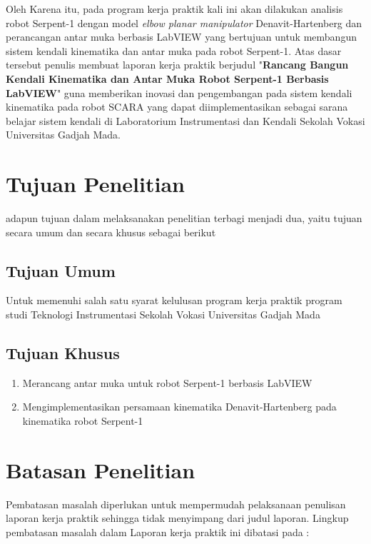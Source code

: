 	Oleh Karena itu, pada program kerja praktik kali ini akan dilakukan analisis robot Serpent-1 dengan model \textit{elbow planar manipulator} Denavit-Hartenberg dan perancangan antar muka berbasis LabVIEW yang bertujuan untuk membangun sistem kendali kinematika dan antar muka pada robot Serpent-1. Atas dasar tersebut penulis membuat laporan kerja praktik berjudul "\textbf{Rancang Bangun Kendali Kinematika dan Antar Muka Robot Serpent-1 Berbasis LabVIEW}" guna memberikan inovasi dan pengembangan pada sistem kendali kinematika pada robot SCARA yang dapat diimplementasikan sebagai sarana belajar sistem kendali di Laboratorium Instrumentasi dan Kendali Sekolah Vokasi Universitas Gadjah Mada.\\


\section{Tujuan Penelitian}
adapun tujuan dalam melaksanakan penelitian terbagi menjadi dua, yaitu tujuan secara umum dan secara khusus sebagai berikut

	\subsection{Tujuan Umum}
	
		Untuk memenuhi salah satu syarat kelulusan program kerja praktik program studi Teknologi Instrumentasi Sekolah Vokasi Universitas Gadjah Mada
		
	\subsection{Tujuan Khusus}
	
	\begin{enumerate}
		\item Merancang antar muka untuk robot Serpent-1 berbasis LabVIEW
		\item Mengimplementasikan persamaan kinematika Denavit-Hartenberg pada kinematika robot Serpent-1
	\end{enumerate}
	
\section{Batasan Penelitian}
	Pembatasan masalah diperlukan untuk mempermudah pelaksanaan penulisan laporan kerja praktik sehingga tidak menyimpang dari judul laporan. Lingkup pembatasan masalah dalam Laporan kerja praktik ini dibatasi pada :
	
